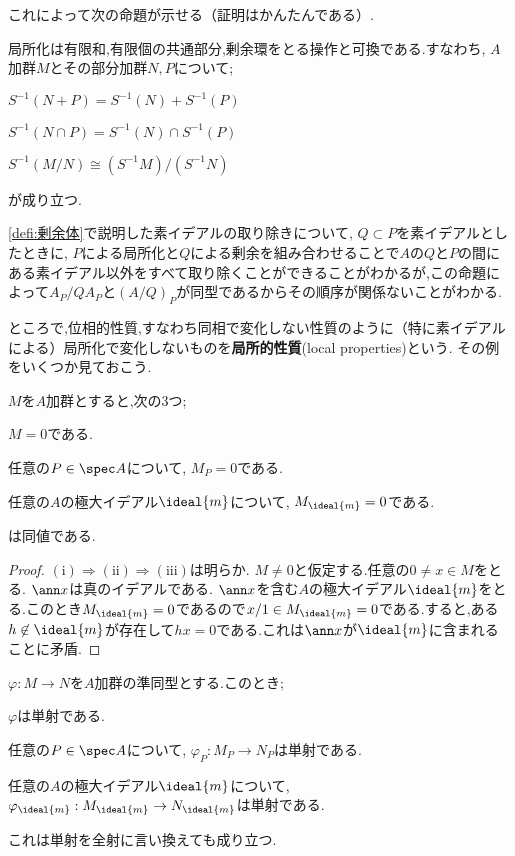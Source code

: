 これによって次の命題が示せる（証明はかんたんである）.
\begin{prop}\label{prop:局所化はいろんな操作と可換}
	局所化は有限和,有限個の共通部分,剰余環をとる操作と可換である.すなわち, $A$加群$M$とその部分加群$N,P$について;
	\begin{sakura}
		\item $S^{-1}(N+P)=S^{-1}(N)+S^{-1}(P)$
		\item $S^{-1}(N\cap P)=S^{-1}(N)\cap S^{-1}(P)$
		\item $S^{-1}(M/N)\cong (S^{-1}M)/(S^{-1}N)$
	\end{sakura}
	が成り立つ.
\end{prop}

\ref{defi:剰余体}で説明した素イデアルの取り除きについて, $Q\subset P$を素イデアルとしたときに, $P$による局所化と$Q$による剰余を組み合わせることで$A$の$Q$と$P$の間にある素イデアル以外をすべて取り除くことができることがわかるが,この命題によって$A_P/QA_P$と$(A/Q)_P$が同型であるからその順序が関係ないことがわかる.

ところで,位相的性質,すなわち同相で変化しない性質のように（特に素イデアルによる）局所化で変化しないものを\textbf{局所的性質}(local properties)という. その例をいくつか見ておこう.

\begin{prop}\label{prop:局所化したら0は局所的}
	$M$を$A$加群とすると,次の3つ;
	\begin{sakura}
		\item $M=0$である.
		\item 任意の$P\in \spec A$について, $M_P=0$である.
		\item 任意の$A$の極大イデアル$\ideal{m}$について, $M_{\ideal{m}}=0$である.
	\end{sakura}
	は同値である.
\end{prop}

\begin{proof}
	$(\text{i})\Longrightarrow(\text{ii})\Longrightarrow(\text{iii})$は明らか. $M\neq0$と仮定する.任意の$0\neq x\in M$をとる. $\ann x$は真のイデアルである. $\ann x$を含む$A$の極大イデアル$\ideal{m}$をとる.このとき$M_{\ideal{m}}=0$であるので$x/1\in M_{\ideal{m}}=0$である.すると,ある$h\not\in\ideal{m}$が存在して$hx=0$である.これは$\ann x$が$\ideal{m}$に含まれることに矛盾.
\end{proof}

\begin{prop}\label{prop:局所的性質}
	$\varphi:M\to N$を$A$加群の準同型とする.このとき;
	\begin{sakura}
		\item $\varphi$は単射である.
		\item 任意の$P\in\spec A$について, $\varphi_P:M_P\to N_P$は単射である.
		\item 任意の$A$の極大イデアル$\ideal{m}$について, 
		$\varphi_{\ideal{m}}:M_{\ideal{m}}\to N_{\ideal{m}}$は単射である.
	\end{sakura}
	これは単射を全射に言い換えても成り立つ.
\end{prop}

